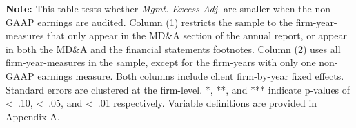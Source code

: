\documentclass[12pt,fleqn]{article}
\begin{document}
\clearpage
\begin{table}[!htbp] 
    \begin{threeparttable}[b]
        \captionsetup{labelfont = bf, singlelinecheck = off, justification = raggedright, labelsep = none}   
        \caption{\\Face versus Notes}
        \small

        \begin{flushleft}
           {\raggedright
           
           \par}
        \end{flushleft}

        \vspace{-6mm}
        \begin{tablenotes}
            \scriptsize
            \item \textbf{Note:}  This table tests whether \textit{Mgmt. Excess Adj.} are smaller when the non-GAAP earnings are audited. Column (1) restricts the sample to the firm-year-measures that only appear in the MD\&A section of the annual report, or appear in both the MD\&A and the financial statements footnotes. Column (2) uses all firm-year-measures in the sample, except for the firm-years with only one non-GAAP earnings measure. Both columns include client firm-by-year fixed effects. Standard errors are clustered at the firm-level. *, **, and *** indicate p-values of \textless\, .10, \textless\, .05, and \textless\, .01 respectively. Variable definitions are provided in Appendix A.
        \end{tablenotes}
        \label{table:facevnootes}
    \end{threeparttable}
\end{table}

\clearpage
\begin{table}[!htbp]
    \begin{threeparttable}[b]
        \captionsetup{labelfont = bf, singlelinecheck = off, justification = raggedright, labelsep = none}
        \caption{\\Specific Audit Procedures}
        \label{table:procs}

        \footnotesize
        \begin{flushleft}
           {\raggedright
           
           \par}
        \end{flushleft}

    \end{threeparttable}
\end{table}
\end{document}
